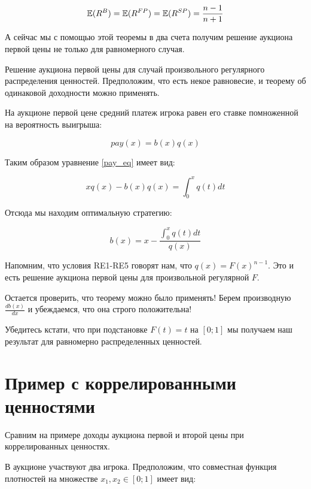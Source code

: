 \begin{equation}
\mathbb{E}(R^{B})=\mathbb{E}(R^{FP})=\mathbb{E}(R^{SP})=\frac{n-1}{n+1}
\end{equation}


А сейчас мы с помощью этой теоремы в два счета получим решение аукциона первой цены не только для равномерного случая. 


\begin{myex} \label{use_ret} Решение аукциона первой цены для случай произвольного регулярного распределения ценностей. Предположим, что есть некое равновесие, и теорему об одинаковой доходности можно применять.

На аукционе первой цене средний платеж игрока равен его ставке помноженной на вероятность выигрыша:

\begin{equation}
\label{first_price_pay_eq}
pay(x)=b(x)q(x)
\end{equation}

Таким образом уравнение \ref{pay_eq} имеет вид:

\begin{equation}
xq(x)-b(x)q(x)=\int_{0}^{x}q(t)dt
\end{equation}

Отсюда мы находим оптимальную стратегию:

\begin{equation}
\label{first_price_b_eq}
b(x)=x-\frac{\int_{0}^{x}q(t)dt}{q(x)}
\end{equation}

Напомним, что условия RE1-RE5 говорят нам, что $ q(x)=F(x)^{n-1} $. Это и есть решение аукциона первой цены для произвольной регулярной $ F $.

Остается проверить, что теорему можно было применять! Берем производную $ \frac{db(x)}{dx} $ и убеждаемся, что она строго положительна! 

Убедитесь кстати, что при подстановке $ F(t)=t $ на $ [0;1] $ мы получаем наш результат для равномерно распределенных ценностей.
\end{myex}




\section{Пример с коррелированными ценностями}


Сравним на примере доходы аукциона первой и второй цены при коррелированных ценностях.

В аукционе участвуют два игрока. Предположим, что совместная функция плотностей на множестве $ x_{1},x_{2}\in [0;1] $ имеет вид:

